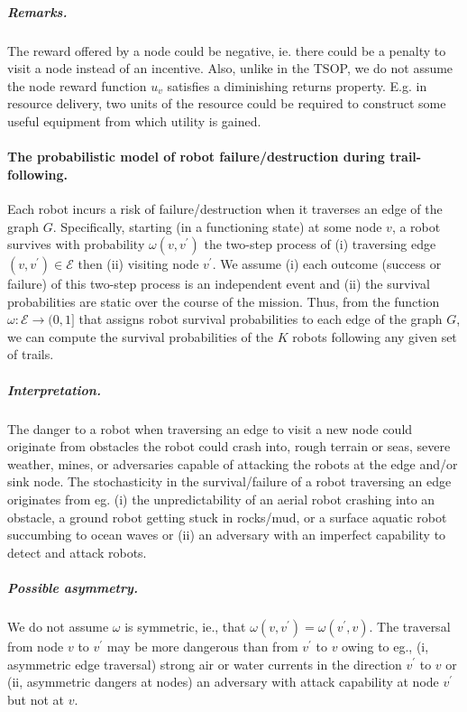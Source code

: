 \documentclass[11pt, oneside]{article}
\begin{document}
\vspace{-\baselineskip}
\subparagraph{Remarks.} The reward offered by a node could be negative, ie. there could be a penalty to visit a node instead of an incentive.
Also, unlike in the TSOP, we do not assume the node reward function $u_v$ satisfies a diminishing returns property. E.g. in resource delivery, two units of the resource could be required to construct some useful equipment from which utility is gained.


\paragraph{The probabilistic model of robot failure/destruction during trail-following.} 
Each robot incurs a risk of failure/destruction when it traverses an edge of the graph $G$.
Specifically, starting (in a functioning state) at some node $v$, a robot survives with probability $\omega(v, v^\prime)$ the two-step process of (i) traversing edge $(v, v^\prime) \in \mathcal{E}$ then (ii) visiting node $v^\prime$. 
We assume (i) each outcome (success or failure) of this two-step process is an independent event and (ii) the survival probabilities are static over the course of the mission. 
Thus, from the function $\omega: \mathcal{E} \rightarrow (0, 1]$ that assigns robot survival probabilities to each edge of the graph $G$, we can compute the survival probabilities of the $K$ robots following any given set of trails.



\vspace{-\baselineskip}
\subparagraph{Interpretation.} The danger to a robot when traversing an edge to visit a new node could originate from obstacles the robot could crash into, rough terrain or seas, severe weather, mines, or adversaries capable of attacking the robots at the edge and/or sink node.
The stochasticity in the survival/failure of a robot traversing an edge originates from eg. (i) the unpredictability of an aerial robot crashing into an obstacle, a ground robot getting stuck in rocks/mud, or a surface aquatic robot succumbing to ocean waves or (ii) an adversary with an imperfect capability to detect and attack robots.

\vspace{-\baselineskip}
\subparagraph{Possible asymmetry.} We do not assume $\omega$ is symmetric, ie., that $\omega(v, v^\prime) = \omega(v^\prime, v)$. The traversal from node $v$ to $v^\prime$ may be more dangerous than from $v^\prime$ to $v$ owing to eg., (i, asymmetric edge traversal) strong air or water currents in the direction $v^\prime$ to $v$ or (ii, asymmetric dangers at nodes) an adversary with attack capability at node $v^\prime$ but not at $v$. %
\end{document}
